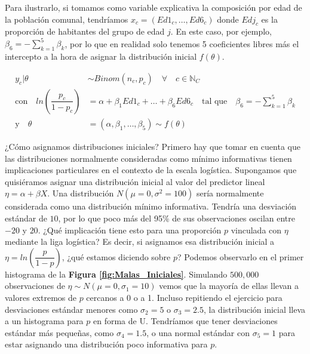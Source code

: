 Para ilustrarlo, si tomamos como variable explicativa la composición por edad de la población comunal, tendríamos $x_c=(Ed1_c, \dots, Ed6_c)$ donde $Edj_c$ es la proporción de habitantes del grupo de edad $j$. En este caso, por ejemplo, $\beta_{6} = -\sum\limits_{k = 1}^5 \beta_k$, por lo que en realidad solo tenemos 5 coeficientes libres más el intercepto a la hora de asignar la distribución inicial $f(\theta)$. 

\begin{align*}
y_c|\theta & \sim Binom(n_c,p_c) \quad \forall \quad c \in \mathbb{N}_C \\
\text{con} \quad ln\left(\dfrac{p_c}{1-p_c}\right) &= \alpha + \beta_1Ed1_c + \dots + \beta_6Ed6_c \quad \text{tal que} \quad \beta_6 = -\sum\limits_{k = 1}^5 \beta_k \nonumber \\
\text{y} \quad \theta &= (\alpha,\beta_1,\dots,\beta_5) \sim f(\theta) 
\end{align*}

¿Cómo asignamos distribuciones iniciales? Primero hay que tomar en cuenta que las distribuciones normalmente consideradas como mínimo informativas tienen implicaciones particulares en el contexto de la escala logística. Supongamos que quisiéramos asignar una distribución inicial al valor del predictor lineal $\eta = \alpha + \beta X$. Una distribución $N(\mu=0,\sigma^2=100)$ sería normalmente considerada como una distribución mínimo informativa. Tendría una desviación estándar de $10$, por lo que poco más del 95\% de sus observaciones oscilan entre $-20$ y $20$. ¿Qué implicación tiene esto para una proporción $p$ vinculada con $\eta$ mediante la liga logística? Es decir, si asignamos esa distribución inicial a $\eta=ln\left(\dfrac{p}{1-p}\right)$, ¿qué estamos diciendo sobre $p$? Podemos observarlo en el primer histograma de la \textbf{Figura \ref{fig:Malas_Iniciales}}. Simulando $500,000$ observaciones de $\eta\sim N(\mu=0,\sigma_1=10)$ vemos que la mayoría de ellas llevan a valores extremos de $p$ cercanos a 0 o a 1. Incluso repitiendo el ejercicio para desviaciones estándar menores como $\sigma_2=5$ o $\sigma_3=2.5$, la distribución inicial lleva a un histograma para $p$ en forma de U. Tendríamos que tener desviaciones estándar más pequeñas, como $\sigma_4=1.5$, o una normal estándar con $\sigma_5=1$ para estar asignando una distribución poco informativa para $p$.\\ 

